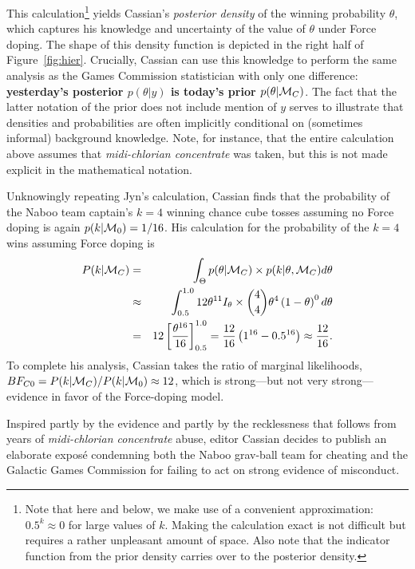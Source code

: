 This calculation\footnote{Note that here and below, we make use of a convenient approximation: $0.5^k \approx 0$ for large values of $k$. Making the calculation exact is not difficult but requires a rather unpleasant amount of space. Also note that the indicator function from the prior density carries over to the posterior density.} yields Cassian's \emph{posterior density} of the winning probability $\theta$, which captures his knowledge and uncertainty of the value of $\theta$ under Force doping. The shape of this density function is depicted in the right half of Figure~\ref{fig:hier}. Crucially, Cassian can use this knowledge to perform the same analysis as the Games Commission statistician with only one difference: \textbf{yesterday's posterior $p(\theta|y)$ is today's prior $p(\theta|{\cal M}_C)$}. The fact that the latter notation of the prior does not include mention of $y$ serves to illustrate that densities and probabilities are often implicitly conditional on (sometimes informal) background knowledge. Note, for instance, that the entire calculation above assumes that \emph{midi-chlorian concentrate} was taken, but this is not made explicit in the mathematical notation.

Unknowingly repeating Jyn's calculation, Cassian finds that the probability of the Naboo team captain's $k=4$ winning chance cube tosses assuming no Force doping is again $p(k|{\cal M}_0) = 1/16$. His calculation for the probability of the $k=4$ wins assuming Force doping is
\begin{eqnarray*}
 P(k|{\cal M}_C) &=& \int_{\Theta} p(\theta|{\cal M}_C)\times p(k|\theta,{\cal M}_C) d \theta \\
     &\approx& \int_{0.5}^{1.0} 12\theta^{11}I_\theta \times \binom{4}{4} \theta^4 \left(1-\theta\right)^0 d \theta \\
           &=& 12 \left[\frac{\theta^{16}}{16} \right]_{0.5}^{1.0}
            = \frac{12}{16} \left(1^{16} - 0.5^{16} \right)
      \approx \frac{12}{16}.
\end{eqnarray*}
To complete his analysis, Cassian takes the ratio of marginal likelihoods, $BF_{C0}=P(k|{\cal M}_C)/P(k|{\cal M}_0) \approx 12$, which is strong---but not very strong---evidence in favor of the Force-doping model.

Inspired partly by the evidence and partly by the recklessness that follows from years of \emph{midi-chlorian concentrate} abuse, editor Cassian decides to publish an elaborate expos\'e condemning both the Naboo grav-ball team for cheating and the Galactic Games Commission for failing to act on strong evidence of misconduct.

